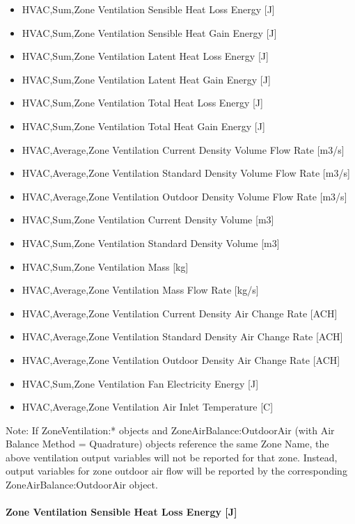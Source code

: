 \begin{itemize}
\item
  HVAC,Sum,Zone Ventilation Sensible Heat Loss Energy {[}J{]}
\item
  HVAC,Sum,Zone Ventilation Sensible Heat Gain Energy {[}J{]}
\item
  HVAC,Sum,Zone Ventilation Latent Heat Loss Energy {[}J{]}
\item
  HVAC,Sum,Zone Ventilation Latent Heat Gain Energy {[}J{]}
\item
  HVAC,Sum,Zone Ventilation Total Heat Loss Energy {[}J{]}
\item
  HVAC,Sum,Zone Ventilation Total Heat Gain Energy {[}J{]}
\item
  HVAC,Average,Zone Ventilation Current Density Volume Flow Rate {[}m3/s{]}
\item
  HVAC,Average,Zone Ventilation Standard Density Volume Flow Rate {[}m3/s{]}
\item
  HVAC,Average,Zone Ventilation Outdoor Density Volume Flow Rate {[}m3/s{]}
\item
  HVAC,Sum,Zone Ventilation Current Density Volume {[}m3{]}
\item
  HVAC,Sum,Zone Ventilation Standard Density Volume {[}m3{]}
\item
  HVAC,Sum,Zone Ventilation Mass {[}kg{]}
\item
  HVAC,Average,Zone Ventilation Mass Flow Rate {[}kg/s{]}
\item
  HVAC,Average,Zone Ventilation Current Density Air Change Rate {[}ACH{]}
\item
  HVAC,Average,Zone Ventilation Standard Density Air Change Rate {[}ACH{]}
\item
  HVAC,Average,Zone Ventilation Outdoor Density Air Change Rate {[}ACH{]}
\item
  HVAC,Sum,Zone Ventilation Fan Electricity Energy {[}J{]}
\item
  HVAC,Average,Zone Ventilation Air Inlet Temperature {[}C{]}
\end{itemize}

Note: If ZoneVentilation:* objects and ZoneAirBalance:OutdoorAir (with Air Balance Method = Quadrature) objects reference the same Zone Name, the above ventilation output variables will not be reported for that zone. Instead, output variables for zone outdoor air flow will be reported by the corresponding ZoneAirBalance:OutdoorAir object.

\paragraph{Zone Ventilation Sensible Heat Loss Energy {[}J{]}}\label{zone-ventilation-sensible-heat-loss-energy-j}

